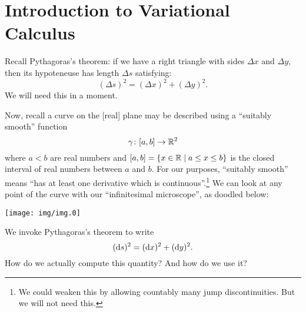 \section{Introduction to Variational Calculus}

Recall Pythagoras's theorem: if we have a right triangle with sides
$\Delta x$ and $\Delta y$, then its hypoteneuse has length $\Delta s$ satisfying:
\begin{equation}
(\Delta s)^{2} = (\Delta x)^{2} + (\Delta y)^{2}.
\end{equation}
We will need this in a moment.

Now, recall a curve on the [real] plane may be described using a
``suitably smooth'' function
\begin{equation}
\gamma\colon [a,b]\to\mathbb{R}^{2}
\end{equation}
where $a < b$ are real numbers and $[a,b] = \{x\in\mathbb{R}\mid a\leq x\leq b\}$
is the closed interval of real numbers between $a$ and $b$. For our
purposes, ``suitably smooth'' means ``has at least one derivative which
is continuous''.\footnote{We could weaken this by allowing countably many
jump discontinuities. But we will not need this.}
We can look at any point of the curve with our ``infinitesimal
microscope'', as doodled below:
\begin{center}
  \texttt{[image: img/img.0]}
\end{center}
We invoke Pythagoras's theorem to write
\begin{equation}
(\mathrm{d} s)^{2} =  (\mathrm{d} x)^{2} + (\mathrm{d} y)^{2}.
\end{equation}
How do we actually compute this quantity? And how do we use it?


